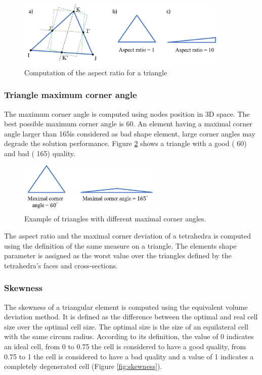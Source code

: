  \begin{figure}[!h]
\centering
\includegraphics[width=0.9\textwidth,keepaspectratio]{figures/aspectRatio.png} 
\caption{Computation of the aspect ratio for a triangle}
\label{fig:aspectratio}
\end{figure}  

\subsubsection*{Triangle maximum corner angle}
The maximum corner angle is computed using nodes position in 3D space. The best possible maximum corner angle is 60\textdegree. An element having a maximal corner angle larger than 165\textdegree is considered as bad shape element, large corner angles may degrade the solution performance. Figure \ref{fig:cornerangle} shows a triangle with a good ( 60\textdegree) and bad ( 165\textdegree) quality. 

 \begin{figure}[!h]
\centering
\includegraphics[width=0.6\textwidth,keepaspectratio]{figures/maximalcornerangle.png} 
\caption{Example of triangles with different maximal corner angles.}
\label{fig:cornerangle}
\end{figure} 

The aspect ratio and the maximal corner deviation of a tetrahedra is computed using the definition of the same measure on a triangle. The elements shape parameter is assigned as the worst value over the triangles defined by the tetrahedra's faces and cross-sections.  

\subsubsection*{Skewness }
The skewness of a triangular element is computed using the equivalent volume deviation method. It is defined as the difference between the optimal and real cell size over the optimal cell size. The optimal size is the size of an equilateral cell with the same circum radius. According to its definition, the value of 0 indicates an ideal cell, from 0 to 0.75 the cell is considered to have a good quality, from 0.75 to 1 the cell is considered to have a bad quality and a value of 1 indicates a completely degenerated cell (Figure \ref{fig:skewness}).   

